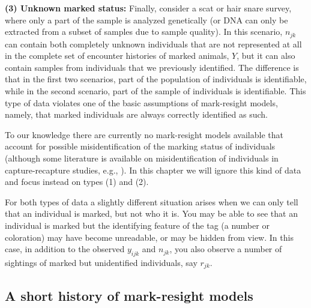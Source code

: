 {\flushleft \bf (3) Unknown marked status:}
Finally, consider a scat or hair snare survey, where only a part of
the sample is analyzed genetically (or DNA can only be extracted
from a subset of samples due to sample quality). In this scenario,
$n_{jk}$ can contain both completely unknown individuals that are
not represented at all in the complete set of encounter histories of marked animals,
{\bf $Y$},
but it can also contain samples
from individuals that we previously identified. The difference is that
in the first two scenarios, part of the population of individuals is
identifiable, while in the second scenario,
 part of the
sample of individuals is identifiable. This type of data
violates one of the basic assumptions of mark-resight models,
namely, that marked individuals are always correctly identified as
such.

To our knowledge there are currently no mark-resight models available
that account for possible misidentification of the marking status of
individuals (although some literature is available on
misidentification of individuals in capture-recapture studies, e.g.,
\citealp{yoshizaki_etal:2009, lukacs_burnham:2005,
  link_etal:2010}). In this chapter we will ignore this kind of data
and focus instead on %
types (1) and (2).


For both types of data a slightly different situation arises when
we can only tell that an individual is marked, but not
who it is. You may be able to see that an individual is marked but the
identifying feature of the tag (a number or coloration) may have
become unreadable, or may be hidden from view. In this case, in
addition to the observed $y_{ijk}$ and $n_{jk}$, you also observe a number of
sightings of marked but unidentified individuals, say $r_{jk}$.

\subsection{A short history of mark-resight models}

